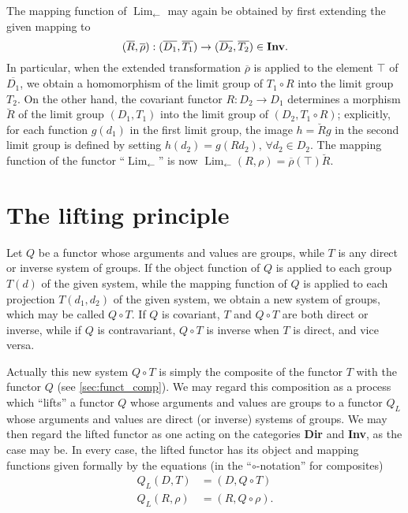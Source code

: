 \documentclass[11pt,a4paper]{report}
\DeclareMathOperator{\Lim}{Lim}
\begin{document}
The mapping function of $\Lim_{\leftarrow}$ may again be obtained by first extending the given mapping  to
\begin{equation*}
	(\overline{R},\overline{\rho}):(\overline{D_1},\overline{T_1})\rightarrow (\overline{D_2},\overline{T_2})\in\text{\textbf{Inv}}.
\end{equation*}
In particular, when the extended transformation $\overline{\rho}$ is applied to the element $\top$ of $\overline{D_1}$, we obtain
a homomorphism of the limit group of $T_1\circ R$ into the limit group $T_2$. On the other hand, the covariant functor
$R:D_2\rightarrow D_1$ determines a morphism $\breve{R}$ of the limit group $(D_1,T_1)$ into the limit group of $(D_2,T_1\circ R)$;
explicitly, for each function $g(d_1)$ in the first limit group, the image $h=\breve{R} g$ in the second limit group is defined
by setting $h(d_2)= g(R d_2),\,\forall d_2\in D_2$. The mapping function of the functor ``$\Lim_{\leftarrow}$'' is now 
$\Lim_{\leftarrow}(R,\rho)=\overline{\rho}(\top)\breve{R}$.

\section{The lifting principle}\label{sec:lift}
Let $Q$ be a functor whose arguments and values are groups, while $T$ is any direct or inverse system of groups. If the object
function of $Q$ is applied to each group $T(d)$ of the given system, while the mapping function of $Q$ is applied to each
projection $T(d_1,d_2)$ of the given system, we obtain a new system of groups, which may be called $Q\circ T$. If $Q$ is
covariant, $T$ and $Q\circ T$ are both direct or inverse, while if $Q$ is contravariant, $Q\circ T$ is inverse when $T$ is 
direct, and vice versa.

Actually this new system $Q\circ T$ is simply the composite of the functor $T$ with the functor $Q$ (see \cref{sec:funct_comp}).
We may regard this composition as a process which ``lifts'' a functor $Q$ whose arguments and values are groups to a functor
$Q_L$ whose arguments and values are direct (or inverse) systems of groups. We may then regard the lifted functor as one acting
on the categories \textbf{Dir} and \textbf{Inv}, as the case may be. In every case, the lifted functor has its object and mapping
functions given formally by the equations (in the ``$\circ$-notation'' for composites)
\begin{align}
	Q_L(D,T)&=(D,Q\circ T)\label{eq:func_lift1}\\
	Q_L(R,\rho)&=(R,Q\circ\rho)\label{eq:func_lift2}.
\end{align}
\end{document}
